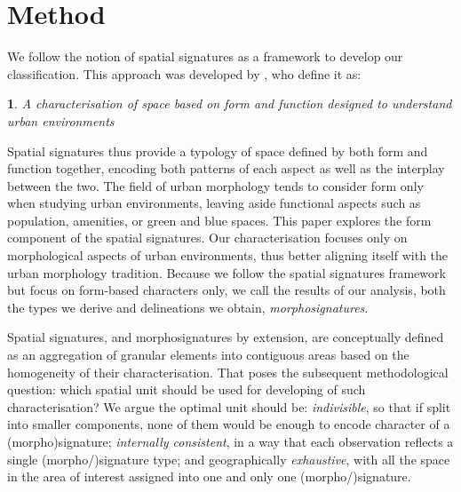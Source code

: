 \section{Method}
\label{sec:meth}

We follow the notion of spatial signatures as a framework
to develop our classification.
This approach was developed by \cite{dab_mf_2021}, who define it as:

\newtheorem*{theorem}{}
\begin{theorem}
    A characterisation of space based on form and function designed to understand urban
environments
\end{theorem}

Spatial signatures thus provide a typology of space defined by both form and function
together, encoding both patterns of each aspect as well as the interplay between the two. 
The field of urban morphology tends to consider form only when studying urban
environments, leaving aside functional aspects such as population, amenities,
or green and blue spaces. 
%
This paper explores the form component of the spatial signatures.
Our characterisation focuses only on morphological aspects of urban
environments, thus better aligning itself with the urban morphology tradition.
Because we follow the spatial signatures framework but focus on form-based
characters only, we call the results of our analysis, both the types we derive
and delineations we obtain, \textit{morphosignatures}.

Spatial signatures, and morphosignatures by extension, are conceptually defined as an aggregation of granular elements into
contiguous areas based on the homogeneity of their characterisation. That
poses the subsequent methodological question: which spatial unit should be
used for developing of such characterisation? We argue the optimal unit should
be: \textit{indivisible}, so that if split into
smaller components, none of them would be enough to encode character of a
(morpho)signature;
\textit{internally consistent}, in a way that each observation reflects a single (morpho/)signature type;
and geographically \textit{exhaustive}, with all the space in the area of
interest assigned into one and only one (morpho/)signature.

